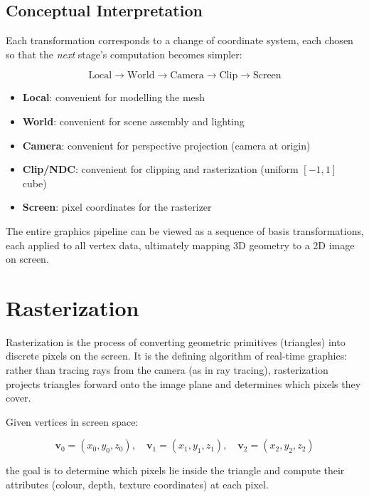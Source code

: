 \documentclass[11pt]{article}
\begin{document}
\subsection{Conceptual Interpretation}

Each transformation corresponds to a change of coordinate system, each chosen so that the \emph{next} stage's computation becomes simpler:

\begin{equation}
    \text{Local} \rightarrow \text{World} \rightarrow \text{Camera} \rightarrow \text{Clip} \rightarrow \text{Screen}
\end{equation}

\begin{itemize}
    \item \textbf{Local}: convenient for modelling the mesh
    \item \textbf{World}: convenient for scene assembly and lighting
    \item \textbf{Camera}: convenient for perspective projection (camera at origin)
    \item \textbf{Clip/NDC}: convenient for clipping and rasterization (uniform $[-1,1]$ cube)
    \item \textbf{Screen}: pixel coordinates for the rasterizer
\end{itemize}

The entire graphics pipeline can be viewed as a sequence of basis transformations, each applied to all vertex data, ultimately mapping 3D geometry to a 2D image on screen.

\section{Rasterization}
\label{sec:rasterization}

Rasterization is the process of converting geometric primitives (triangles) into discrete pixels on the screen. It is the defining algorithm of real-time graphics: rather than tracing rays from the camera (as in ray tracing), rasterization projects triangles forward onto the image plane and determines which pixels they cover.

Given vertices in screen space:

\begin{equation}
    \mathbf{v}_0 = (x_0, y_0, z_0), \quad
    \mathbf{v}_1 = (x_1, y_1, z_1), \quad
    \mathbf{v}_2 = (x_2, y_2, z_2)
\end{equation}

the goal is to determine which pixels lie inside the triangle and compute their attributes (colour, depth, texture coordinates) at each pixel.
\end{document}
